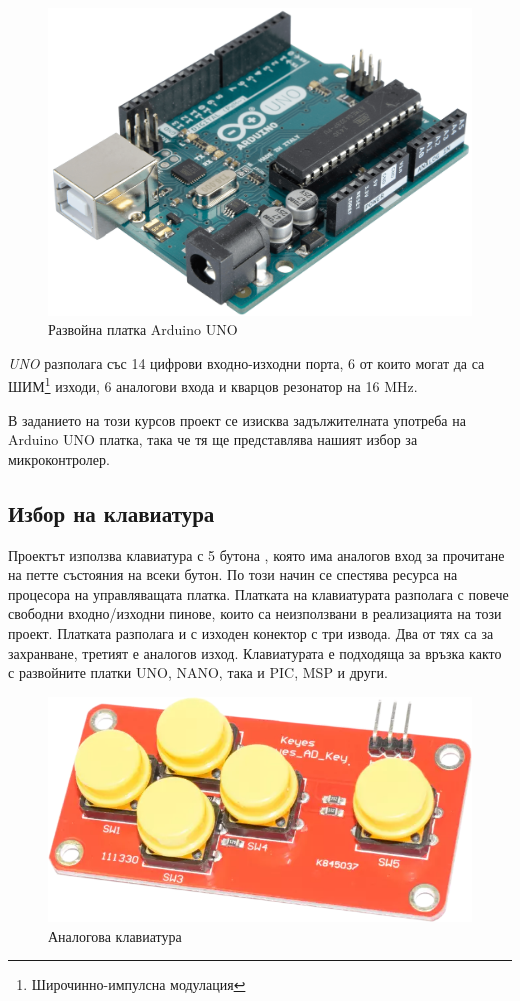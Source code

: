 \documentclass[titlepage, oneside, 14pt]{extbook}
\newcommand{\ard}{Arduino\texttrademark{}}
\begin{document}
\begin{figure}[!htbp]
    \centering
    \includegraphics[width=0.5\linewidth]{img/arduino.png}
    \caption{Развойна платка \ard{} UNO}
\end{figure}

\textit{UNO} разполага със 14 цифрови входно-изходни порта, 6 от които могат да
са ШИМ\footnote{Широчинно-импулсна модулация} изходи, 6 аналогови входа и
кварцов резонатор на 16 MHz.

В заданието на този курсов проект се изисква задължителната употреба на \ard{} UNO
платка, така че тя ще представлява нашият избор за микроконтролер.

\subsection{Избор на клавиатура}

Проектът използва клавиатура с 5 бутона \cite{keypads}, която има аналогов вход за
прочитане на петте състояния на всеки бутон. По този начин се спестява ресурса
на процесора на управляващата платка. Платката на клавиатурата разполага с повече свободни входно/изходни
пинове, които са неизползвани в реализацията на този проект. Платката
разполага и с изходен конектор с три извода. Два от тях са за захранване, третият
е аналогов изход. Клавиатурата е подходяща за връзка както с развойните платки
UNO, NANO, така и PIC, MSP и други.

\begin{figure}[!htbp]
    \centering
    \includegraphics[width=0.5\linewidth]{img/keypad.png}
    \caption{Аналогова клавиатура}
\end{figure}
\end{document}
